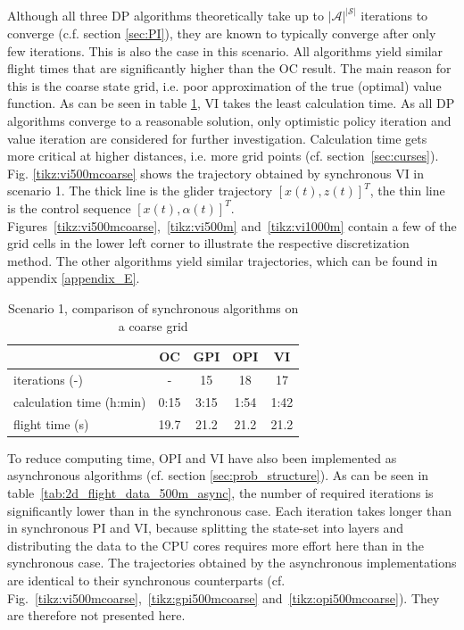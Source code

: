 Although all three DP algorithms theoretically take up to $|\mathcal{A}|^{|\mathcal{S}|}$ iterations to converge (c.f. section \ref{sec:PI}), they are known to typically converge after only few iterations. This is also the case in this scenario. All algorithms yield similar flight times that are significantly higher than the OC result. The main reason for this is the coarse state grid, i.e. poor approximation of the true (optimal) value function. As can be seen in table \ref{tab:2d_flight_data_500m}, VI takes the least calculation time. As all DP algorithms converge to a reasonable solution, only optimistic policy iteration and value iteration are considered for further investigation. Calculation time gets more critical at higher distances, i.e. more grid points (cf. section~\ref{sec:curses}). Fig. \ref{tikz:vi500mcoarse} shows the trajectory obtained by synchronous VI in scenario 1. The thick line is the glider trajectory $[x(t),z(t)]^T$, the thin line is the control sequence $[x(t),\alpha(t)]^T$. Figures~\ref{tikz:vi500mcoarse},~\ref{tikz:vi500m} and~\ref{tikz:vi1000m} contain a few of the grid cells in the lower left corner to illustrate the respective discretization method. The other algorithms yield similar trajectories, which can be found in appendix \ref{appendix_E}.

\begin{table}[htb]
	\begin{center}
		\begin{tabular}{l|c c c c}
			 & OC & GPI & OPI & VI \\ \hline
			iterations (-) & - & 15 & 18 & 17 \\
			calculation time (h:min) & 0:15 & 3:15 & 1:54 & 1:42 \\
			flight time (s) & 19.7 & 21.2 & 21.2 & 21.2
		\end{tabular}
		\caption{Scenario 1, comparison of synchronous algorithms on a coarse grid}
		\label{tab:2d_flight_data_500m}
	\end{center}
\end{table}

To reduce computing time, OPI and VI have also been implemented as asynchronous algorithms (cf. section \ref{sec:prob_structure}). As can be seen in table~\ref{tab:2d_flight_data_500m_async}, the number of required iterations is significantly lower than in the synchronous case. Each iteration takes longer than in synchronous PI and VI, because splitting the state-set into layers and distributing the data to the CPU cores requires more effort here than in the synchronous case. The trajectories obtained by the asynchronous implementations are identical to their synchronous counterparts (cf. Fig.~\ref{tikz:vi500mcoarse},~\ref{tikz:gpi500mcoarse} and~\ref{tikz:opi500mcoarse}). They are therefore not presented here.

